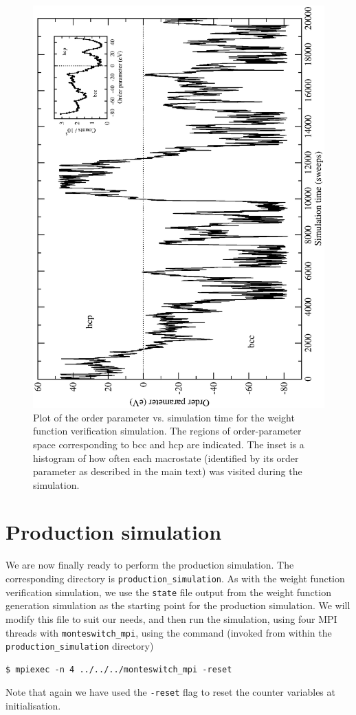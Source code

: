 \documentclass{report}
\begin{document}
\begin{figure}
\centering
\includegraphics[height=\textwidth,angle=270]{verification_results}
\caption
{Plot of the order parameter vs. simulation time for the weight function verification simulation. The regions of order-parameter space 
corresponding to bcc and hcp are indicated. The inset is a histogram of how often each macrostate (identified by its order parameter as described
in the main text) was visited during the simulation.}
\label{fig:verification_results}
\end{figure}


\section{Production simulation}
We are now finally ready to perform the production simulation. The corresponding directory is \texttt{production\_simulation}.
As with the weight function verification simulation, we use the \texttt{state} file output from the weight function generation simulation as 
the starting point for the production simulation. We will modify this file to suit our needs, and then run the simulation, using four MPI threads with 
\texttt{monteswitch\_mpi}, using the command (invoked from within the \texttt{production\_simulation} directory)
\begin{verbatim}
$ mpiexec -n 4 ../../../monteswitch_mpi -reset
\end{verbatim}
Note that again we have used the \texttt{-reset} flag to reset the counter variables at initialisation.
\end{document}
